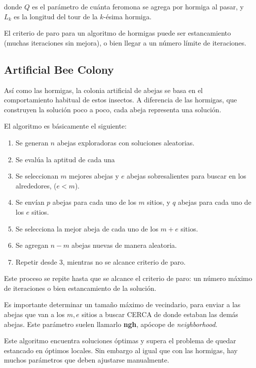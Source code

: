 \documentclass[titlepage, letterpaper]{article}
\begin{document}
donde $Q$ es el parámetro de cuánta feromona se agrega por hormiga al pasar, y $L_k$ es la longitud del tour de la $k$-ésima hormiga.

El criterio de paro para un algoritmo de hormigas puede ser estancamiento (muchas iteraciones sin mejora), o bien llegar a un número límite de iteraciones.

\subsection{Artificial Bee Colony} %
\label{sub:bees}

Así como las hormigas, la colonia artificial de abejas se basa en el comportamiento habitual de estos insectos.
A diferencia de las hormigas, que construyen la solución poco a poco, cada abeja representa una solución.

El algoritmo es básicamente el siguiente:

\begin{tcolorbox}
\begin{enumerate}
    \item Se generan $n$ abejas exploradoras con soluciones aleatorias.
    \item Se evalúa la aptitud de cada una
    \item Se seleccionan $m$ mejores abejas y $e$ abejas sobresalientes para buscar en los alrededores, ($e < m$).
    \item Se envían $p$ abejas para cada uno de los $m$ sitios, y $q$ abejas para cada uno de los $e$ sitios.
    \item Se selecciona la mejor abeja de cada uno de los $m+e$ sitios.
    \item Se agregan $n-m$ abejas nuevas de manera aleatoria.
    \item Repetir desde 3, mientras no se alcance criterio de paro.
\end{enumerate}

Este proceso se repite hasta que se alcance el criterio de paro: un número máximo de iteraciones o bien estancamiento de la solución.
\end{tcolorbox}

Es importante determinar un tamaño máximo de vecindario, para enviar a las abejas que van a los $m,e$ sitios a buscar CERCA de donde estaban las demás abejas.
Este parámetro suelen llamarlo \textbf{ngh}, apócope de \textit{neighborhood}.

Este algoritmo encuentra soluciones óptimas y supera el problema de quedar estancado en óptimos locales.
Sin embargo al igual que con las hormigas, hay muchos parámetros que deben ajustarse manualmente.
\end{document}
